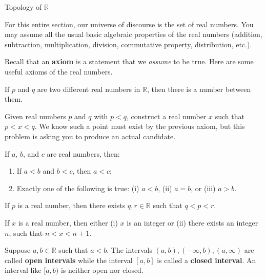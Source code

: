 \begin{section}{Topology of $\mathbb{R}$}


For this entire section, our universe of discourse is the set of real numbers.  You may assume all the usual basic algebraic properties of the real numbers (addition, subtraction, multiplication, division, commutative property, distribution, etc.).

Recall that an \textbf{axiom} is a statement that we \emph{assume} to be true.  Here are some useful axioms of the real numbers.

\begin{axiom} 
If $p$ and $q$ are two different real numbers in $\mathbb{R}$, then there is a number between them.
\end{axiom}

\begin{problem}
Given real numbers $p$ and $q$ with $p<q$, construct a real number $x$ such that $p<x<q$.  We know such a point must exist by the previous axiom, but this problem is asking you to produce an actual candidate.
\end{problem}

\begin{axiom} If $a$, $b$, and $c$ are real numbers, then:
\begin{enumerate}[label=\textrm{(\alph*)}]
\item If $a < b$ and $b<c$, then $a<c$;
\item Exactly one of the following is true: (i) $a < b$, (ii) $a=b$, or (iii) $a>b$.
\end{enumerate}
\end{axiom}

\begin{axiom}
If $p$ is a real number, then there exists $q,r\in\mathbb{R}$ such that $q<p<r$.
\end{axiom}

\begin{axiom} If $x$ is a real number, then either (i) $x$ is an integer or (ii) there exists an integer $n$, such that $n<x<n+1$. 
\end{axiom}

\begin{definition}
Suppose $a,b\in\mathbb{R}$ such that $a<b$.  The intervals $(a,b), (-\infty,b), (a,\infty)$ are called \textbf{open intervals} while the interval $[a,b]$ is called a \textbf{closed interval}.  An interval like $[a,b)$ is neither open nor closed.
\end{definition}


\end{section}

